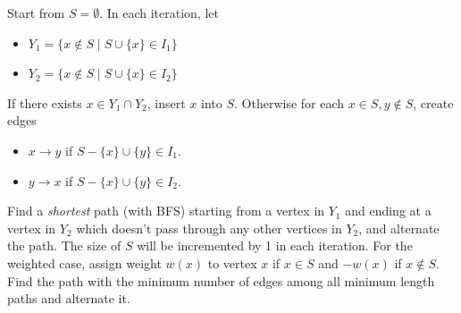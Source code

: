 Start from $S = \emptyset$. In each iteration, let
\begin{itemize}
  \item $Y_1 = \{x \not\in S \mid S \cup \{x\} \in I_1 \}$
  \item $Y_2 = \{x \not\in S \mid S \cup \{x\} \in I_2 \}$
\end{itemize}
If there exists $x \in Y_1 \cap Y_2$, insert $x$ into $S$. Otherwise for each $x \in S, y \not\in S$, create edges
\begin{itemize}
  \item $x \to y$ if $S - \{x\} \cup \{y\} \in I_1$.
  \item $y \to x$ if $S - \{x\} \cup \{y\} \in I_2$.
\end{itemize}
Find a \textit{shortest} path (with BFS) starting from a vertex in $Y_1$ and ending at a vertex in $Y_2$ which doesn't pass through any other vertices in $Y_2$, and alternate the path. The size of $S$ will be incremented by 1 in each iteration. For the weighted case, assign weight $w(x)$ to vertex $x$ if $x \in S$ and $-w(x)$ if $x \not\in S$. Find the path with the minimum number of edges among all minimum length paths and alternate it.
